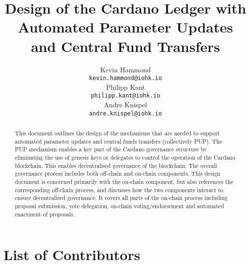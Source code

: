 

\cleardoublepage
\renewcommand{\thepage}{\arabic{page}}
\setcounter{page}{1}

\title{Design of the Cardano Ledger with Automated Parameter Updates and Central Fund Transfers}

\author{
   Kevin Hammond \\ {\small \texttt{kevin.hammond@iohk.io}} \\
   Philipp Kant \\ {\small \texttt{philipp.kant@iohk.io}} \\
   Andre Knispel \\ {\small \texttt{andre.knispel@iohk.io}} \\
   }

\date{}

\maketitle

\begin{abstract}
  This document outlines the design of the mechanisms that are needed to support
  automated parameter updates and central funds transfers (collectively PUP).  The PUP mechanism enables a key part of the Cardano governance structure by
  eliminating the use of genesis keys or delegates to control the operation of the Cardano blockchain.  This enables decentralised governance of the blockchain.
  The overall governance process includes both
  off-chain and on-chain components.  This design document is concerned primarily with the on-chain component, but also references the corresponding off-chain
  process, and discusses how the two components interact to ensure decentralised governance.  It covers all parts of the on-chain process including proposal submission,
  vote delegation, on-chain voting/endorsement and automated enactment of proposals.
\end{abstract}

\section*{List of Contributors}
\label{acknowledgements}

